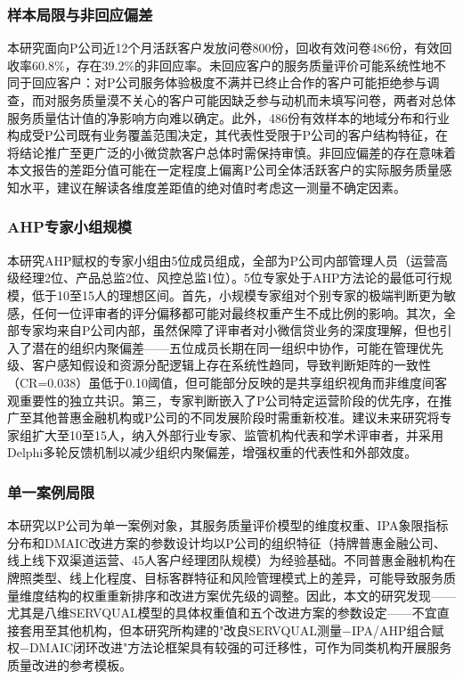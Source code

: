\subsubsection{样本局限与非回应偏差}

本研究面向P公司近12个月活跃客户发放问卷800份，回收有效问卷486份，有效回收率60.8\%，存在39.2\%的非回应率。未回应客户的服务质量评价可能系统性地不同于回应客户：对P公司服务体验极度不满并已终止合作的客户可能拒绝参与调查，而对服务质量漠不关心的客户可能因缺乏参与动机而未填写问卷，两者对总体服务质量估计值的净影响方向难以确定。此外，486份有效样本的地域分布和行业构成受P公司既有业务覆盖范围决定，其代表性受限于P公司的客户结构特征，在将结论推广至更广泛的小微贷款客户总体时需保持审慎。非回应偏差的存在意味着本文报告的差距分值可能在一定程度上偏离P公司全体活跃客户的实际服务质量感知水平，建议在解读各维度差距值的绝对值时考虑这一测量不确定因素。\par

\subsubsection{AHP专家小组规模}

本研究AHP赋权的专家小组由5位成员组成，全部为P公司内部管理人员（运营高级经理2位、产品总监2位、风控总监1位）。5位专家处于AHP方法论的最低可行规模\cite{ref41,ref63}，低于10至15人的理想区间。首先，小规模专家组对个别专家的极端判断更为敏感，任何一位评审者的评分偏移都可能对最终权重产生不成比例的影响。其次，全部专家均来自P公司内部，虽然保障了评审者对小微信贷业务的深度理解，但也引入了潜在的组织内聚偏差——五位成员长期在同一组织中协作，可能在管理优先级、客户感知假设和资源分配逻辑上存在系统性趋同，导致判断矩阵的一致性（CR=0.038）虽低于0.10阈值，但可能部分反映的是共享组织视角而非维度间客观重要性的独立共识。第三，专家判断嵌入了P公司特定运营阶段的优先序，在推广至其他普惠金融机构或P公司的不同发展阶段时需重新校准。建议未来研究将专家组扩大至10至15人，纳入外部行业专家、监管机构代表和学术评审者，并采用Delphi多轮反馈机制以减少组织内聚偏差，增强权重的代表性和外部效度。\par

\subsubsection{单一案例局限}

本研究以P公司为单一案例对象，其服务质量评价模型的维度权重、IPA象限指标分布和DMAIC改进方案的参数设计均以P公司的组织特征（持牌普惠金融公司、线上线下双渠道运营、45人客户经理团队规模）为经验基础。不同普惠金融机构在牌照类型、线上化程度、目标客群特征和风险管理模式上的差异，可能导致服务质量维度结构的权重重新排序和改进方案优先级的调整。因此，本文的研究发现——尤其是八维SERVQUAL模型的具体权重值和五个改进方案的参数设定——不宜直接套用至其他机构，但本研究所构建的"改良SERVQUAL测量$-$IPA/AHP组合赋权$-$DMAIC闭环改进"方法论框架具有较强的可迁移性，可作为同类机构开展服务质量改进的参考模板。\par
